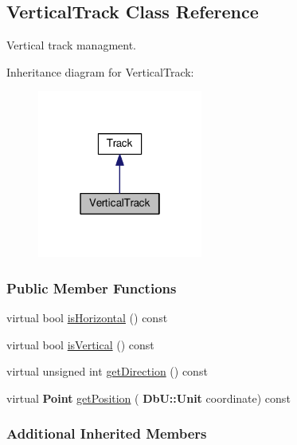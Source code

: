 \hypertarget{classKite_1_1VerticalTrack}{}\subsection{Vertical\+Track Class Reference}
\label{classKite_1_1VerticalTrack}


Vertical track managment.  




Inheritance diagram for Vertical\+Track\+:\nopagebreak
\begin{figure}[H]
\begin{center}
\leavevmode
\includegraphics[width=154pt]{classKite_1_1VerticalTrack__inherit__graph}
\end{center}
\end{figure}
\subsubsection*{Public Member Functions}
\begin{DoxyCompactItemize}
\item 
virtual bool \mbox{\hyperlink{classKite_1_1VerticalTrack_a21b9cefd33ae22e4c2070ad441bdd30b}{is\+Horizontal}} () const
\item 
virtual bool \mbox{\hyperlink{classKite_1_1VerticalTrack_abd54544ef1710ee4b67cfb021d73446c}{is\+Vertical}} () const
\item 
virtual unsigned int \mbox{\hyperlink{classKite_1_1VerticalTrack_a0dd7cf705ace42c662c289955313b2e9}{get\+Direction}} () const
\item 
virtual \textbf{ Point} \mbox{\hyperlink{classKite_1_1VerticalTrack_a6ab4f8026e4500918aa8721f1199f8b6}{get\+Position}} (\textbf{ Db\+U\+::\+Unit} coordinate) const
\end{DoxyCompactItemize}
\subsubsection*{Additional Inherited Members}


